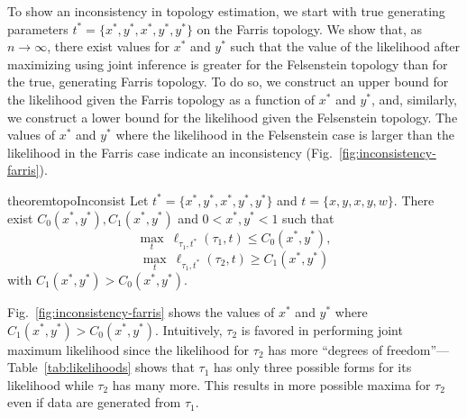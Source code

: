 \documentclass{article}
\newcommand{\nCols}{n}
\begin{document}
To show an inconsistency in topology estimation, we start with true generating parameters $t^*=\{x^*, y^*, x^*, y^*, y^*\}$ on the Farris topology.
We show that, as $\nCols\rightarrow\infty$, there exist values for $x^*$ and $y^*$ such that the value of the likelihood after maximizing using joint inference is greater for the Felsenstein topology than for the true, generating Farris topology.
To do so, we construct an upper bound for the likelihood given the Farris topology as a function of $x^*$ and $y^*$, and, similarly, we construct a lower bound for the likelihood given the Felsenstein topology.
The values of $x^*$ and $y^*$ where the likelihood in the Felsenstein case is larger than the likelihood in the Farris case indicate an inconsistency (Fig.~\ref{fig:inconsistency-farris}).
\begin{restatable}{theorem}{topoInconsist}
Let $t^*=\{x^*, y^*, x^*, y^*, y^*\}$ and $t=\{x, y, x, y, w\}$.
There exist $C_0(x^*, y^*), C_1(x^*, y^*)$ and $0 < x^*, y^* < 1$ such that
$$
\max_{t} \ \ell_{\tau_1,t^*}(\tau_1, t) \le C_0(x^*, y^*),
$$
$$
\max_{t} \ \ell_{\tau_1,t^*}(\tau_2, t) \ge C_1(x^*, y^*)
$$
with $C_1(x^*, y^*) > C_0(x^*, y^*)$.
\end{restatable}
Fig.~\ref{fig:inconsistency-farris} shows the values of $x^*$ and $y^*$ where $C_1(x^*, y^*) > C_0(x^*, y^*)$.
Intuitively, $\tau_2$ is favored in performing joint maximum likelihood since the likelihood for $\tau_2$ has more ``degrees of freedom''---Table~\ref{tab:likelihoods} shows that $\tau_1$ has only three possible forms for its likelihood while $\tau_2$ has many more.
This results in more possible maxima for $\tau_2$ even if data are generated from $\tau_1$.
\end{document}

